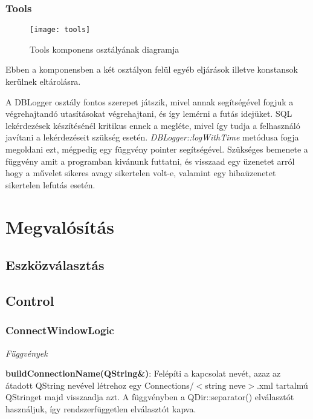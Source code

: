 \subsubsection{Tools}

\begin{figure}[ht]
  \begin{center}
  \texttt{[image: tools]}
  \end{center}
 \caption{Tools komponens osztályának diagramja}
\end{figure}

Ebben a komponensben a két osztályon felül egyéb eljárások illetve konstansok kerülnek eltárolásra.

A DBLogger osztály fontos szerepet játszik, mivel annak segítségével fogjuk a végrehajtandó utasításokat végrehajtani, és így lemérni a futás
idejüket. SQL lekérdezések készítésénél kritikus ennek a megléte, mivel így tudja a felhasználó javítani a lekérdezéseit szükség esetén.
\textit{DBLogger::logWithTime} metódusa fogja megoldani ezt, mégpedig egy függvény pointer segítségével. Szükséges bemenete a függvény amit
a programban kivánunk futtatni, és visszaad egy üzenetet arról hogy a művelet sikeres avagy sikertelen volt-e, valamint egy hibaüzenetet
sikertelen lefutás esetén.

\section{Megvalósítás}
\subsection{Eszközválasztás}

\subsection{Control}

\subsubsection{ConnectWindowLogic}

\textit{Függvények}

\textbf{buildConnectionName(QString\&)}: Felépíti a kapcsolat nevét, azaz az átadott QString nevével létrehoz egy
Connections/$<$string neve$>$.xml tartalmú QStringet majd visszaadja azt. A függvényben a QDir::separator() elválasztót
használjuk, így rendszerfüggetlen elválasztót kapva.

